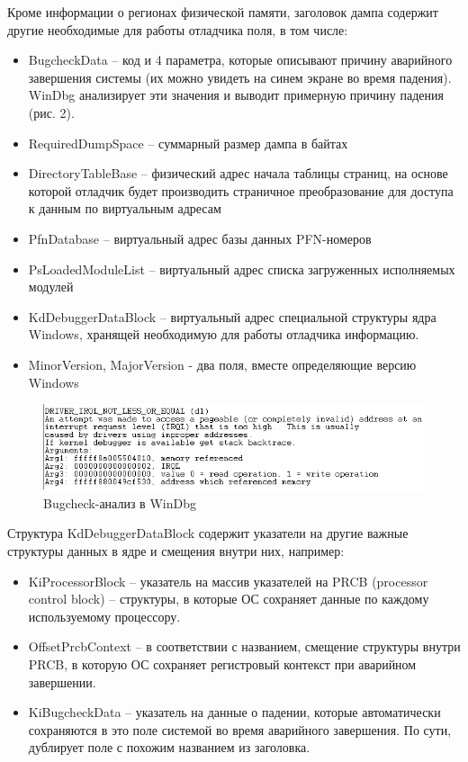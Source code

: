 \documentclass{mipt-thesis-bs}
\begin{document}
Кроме информации о регионах физической памяти, заголовок дампа содержит другие необходимые для работы отладчика поля, в том числе:

\begin{itemize}
    \item BugcheckData -- код и 4 параметра, которые описывают причину аварийного завершения системы (их можно увидеть на синем экране во время падения). WinDbg анализирует эти значения и выводит примерную причину падения (рис. 2).
    \item RequiredDumpSpace -- суммарный размер дампа в байтах
    \item DirectoryTableBase -- физический адрес начала таблицы страниц, на основе которой отладчик будет производить страничное преобразование для доступа к данным по виртуальным адресам
    \item PfnDatabase -- виртуальный адрес базы данных PFN-номеров
    \item PsLoadedModuleList -- виртуальный адрес списка загруженных исполняемых модулей
    \item KdDebuggerDataBlock -- виртуальный адрес специальной структуры ядра Windows, хранящей необходимую для работы отладчика информацию.
    \item MinorVersion, MajorVersion - два поля, вместе определяющие версию Windows
\end{itemize}

\begin{figure}[h]
\begin{center}
    \includegraphics{ss1.png}
    \caption{Bugcheck-анализ в WinDbg}
\end{center}
\end{figure}

Структура KdDebuggerDataBlock содержит указатели на другие важные структуры данных в ядре и смещения внутри них, например:
\begin{itemize}
\item KiProcessorBlock -- указатель на массив указателей на PRCB (processor control block) -- структуры, в которые ОС сохраняет данные по каждому используемому процессору.
\item OffsetPrcbContext -- в соответствии с названием, смещение структуры внутри PRCB, в которую ОС сохраняет регистровый контекст при аварийном завершении. 
\item KiBugcheckData -- указатель на данные о падении, которые автоматически сохраняются в это поле системой во время аварийного завершения. По сути, дублирует поле с похожим названием из заголовка.
\end{itemize}
\end{document}
